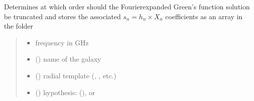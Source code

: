 \documentclass[letterpaper,10pt,english]{sphinxmanual}
\begin{document}

\begin{fulllineitems}
\label{\detokenize{diffsph:diffsph.pyflux.which_N}}
\pysigstartsignatures
{}
\pysigstopsignatures
\sphinxAtStartPar
Determines at which order should the Fourier\sphinxhyphen{}expanded Green’s function solution be truncated and stores the associated \(s_n = h_n\times X_n\) coefficients as an array in the  folder
\begin{quote}\begin{description}
\begin{itemize}
\item {} 
\sphinxAtStartPar
{} \textendash{} frequency in GHz

\item {} 
\sphinxAtStartPar
{} () \textendash{} name of the galaxy

\item {} 
\sphinxAtStartPar
{} () \textendash{} radial template (, , etc.)

\item {} 
\sphinxAtStartPar
{} () \textendash{} hypothesis:  (),  or 


\end{itemize}
\end{description}
\end{quote}
\end{fulllineitems}
\end{document}
